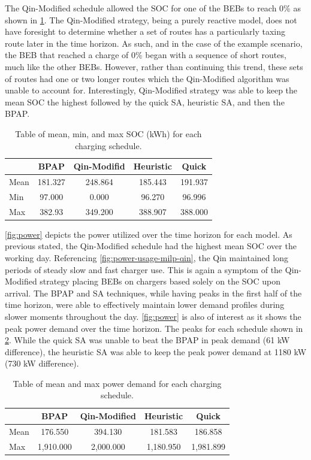 \documentclass[energies,article,submit,moreauthors]{Definitions/mdpi}
\begin{document}
The Qin-Modified schedule allowed the SOC for one of the BEBs to reach 0\% as shown in \ref{tab:charge}. The Qin-Modified
strategy, being a purely reactive model, does not have foresight to determine whether a set of routes has a particularly
taxing route later in the time horizon. As such, and in the case of the example scenario, the BEB that reached a charge
of 0\% began with a sequence of short routes, much like the other BEBs. However, rather than continuing this trend, these
sets of routes had one or two longer routes which the Qin-Modified algorithm was unable to account for. Interestingly,
Qin-Modified strategy was able to keep the mean SOC the highest followed by the quick SA, heuristic SA, and then the
BPAP.

\begin{table}[htbp]
\caption{\label{tab:charge}Table of mean, min, and max SOC (kWh) for each charging schedule.}
\centering
\begin{tabular}{l|cccc}
\hline
 & BPAP & Qin-Modifid & Heuristic & Quick\\[0pt]
\hline
Mean & 181.327 & 248.864 & 185.443 & 191.937\\[0pt]
Min & 97.000 & 0.000 & 96.270 & 96.996\\[0pt]
Max & 382.93 & 349.200 & 388.907 & 388.000\\[0pt]
\hline
\end{tabular}
\end{table}

\ref{fig:power} depicts the power utilized over the time horizon for each model. As previous stated, the Qin-Modified
schedule had the highest mean SOC over the working day. Referencing \ref{fig:power-usage-milp-qin}, the Qin maintained
long periods of steady slow and fast charger use. This is again a symptom of the Qin-Modified strategy placing BEBs on
chargers based solely on the SOC upon arrival. The BPAP and SA techniques, while having peaks in the first half of the
time horizon, were able to effectively maintain lower demand profiles during slower moments throughout the day.
\ref{fig:power} is also of interest as it shows the peak power demand over the time horizon. The peaks for each schedule
shown in \ref{tab:power}. While the quick SA was unable to beat the BPAP in peak demand (61 kW difference), the
heuristic SA was able to keep the peak power demand at 1180 kW (730 kW difference).

\begin{table}[htbp]
\caption{\label{tab:power}Table of mean and max power demand for each charging schedule.}
\centering
\begin{tabular}{l|cccc}
\hline
 & BPAP & Qin-Modified & Heuristic & Quick\\[0pt]
\hline
Mean & 176.550 & 394.130 & 181.583 & 186.858\\[0pt]
Max & 1,910.000 & 2,000.000 & 1,180.950 & 1,981.899\\[0pt]
\hline
\end{tabular}
\end{table}
\end{document}
